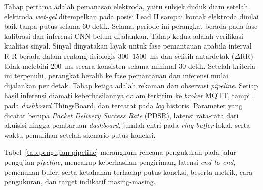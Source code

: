 Tahap pertama adalah pemanasan elektroda, yaitu subjek duduk diam setelah elektroda \textit{wet-gel} ditempelkan pada posisi Lead II sampai kontak elektroda dinilai baik tanpa putus selama 60 detik. Selama periode ini perangkat berada pada fase kalibrasi dan inferensi CNN belum dijalankan. Tahap kedua adalah verifikasi kualitas sinyal. Sinyal dinyatakan layak untuk fase pemantauan apabila interval R-R berada dalam rentang fisiologis 300--1500~ms dan selisih antardetak (\(\Delta\)RR) tidak melebihi 200~ms secara konsisten selama minimal 30 detik. Setelah kriteria ini terpenuhi, perangkat beralih ke fase pemantauan dan inferensi mulai dijalankan per detak. Tahap ketiga adalah rekaman dan observasi \textit{pipeline}. Setiap hasil inferensi diamati keberhasilannya dalam terkirim ke \textit{broker} MQTT, tampil pada \textit{dashboard} ThingsBoard, dan tercatat pada \textit{log} historis. Parameter yang dicatat berupa \textit{Packet Delivery Success Rate} (PDSR), latensi rata-rata dari akuisisi hingga pembaruan \textit{dashboard}, jumlah entri pada \textit{ring buffer} lokal, serta waktu pemulihan setelah skenario putus koneksi.


Tabel~\ref{tab:pengujian-pipeline} merangkum rencana pengukuran pada jalur pengujian \textit{pipeline}, mencakup keberhasilan pengiriman, latensi \textit{end-to-end}, pemenuhan bufer, serta ketahanan terhadap putus koneksi, beserta metrik, cara pengukuran, dan target indikatif masing-masing.


